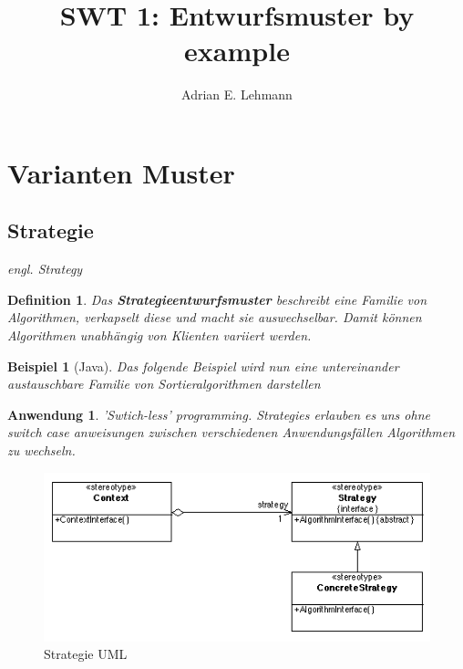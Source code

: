 \documentclass[a4paper]{article}
\title{SWT 1: Entwurfsmuster by example}
\author{Adrian E. Lehmann}
\theoremstyle{break}
\newtheorem{defi}{Definition}[section]
\newtheorem{ex}{Beispiel}[section]
\newtheorem{why}{Anwendung}[section]
\begin{document}
\maketitle
\tableofcontents
\newpage

\section{Varianten Muster}

\subsection{Strategie}

\textit{engl. Strategy}

\begin{defi}
	Das \textbf{Strategieentwurfsmuster} beschreibt eine Familie von Algorithmen, verkapselt diese und macht sie auswechselbar. Damit können Algorithmen unabhängig von Klienten variiert werden.
\end{defi}

\begin{ex}[Java]
	Das folgende Beispiel wird nun eine untereinander austauschbare Familie von Sortieralgorithmen darstellen


	
	
	
	
		
\end{ex}

\begin{why}
	'Swtich-less' programming. Strategies erlauben es uns ohne switch case anweisungen zwischen verschiedenen Anwendungsfällen Algorithmen zu wechseln.
\end{why}
\begin{figure}[H]
	\centering
	\includegraphics[width=\textwidth]{../diagrams/uml/StrategyPattern.png}
	\caption{Strategie UML}
\end{figure}
\end{document}
